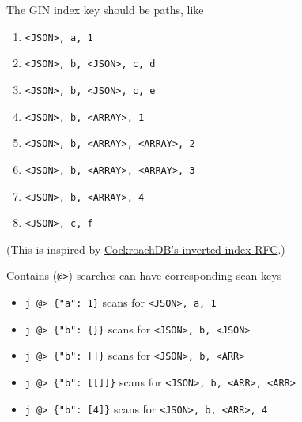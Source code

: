 \documentclass[
]{article}
\providecommand{\tightlist}{%
  \setlength{\itemsep}{0pt}\setlength{\parskip}{0pt}}
\begin{document}
The GIN index key should be paths, like

\begin{enumerate}
\def\labelenumi{\arabic{enumi}.}
\tightlist
\item
  \texttt{\textless{}JSON\textgreater{},\ a,\ 1}
\item
  \texttt{\textless{}JSON\textgreater{},\ b,\ \textless{}JSON\textgreater{},\ c,\ d}
\item
  \texttt{\textless{}JSON\textgreater{},\ b,\ \textless{}JSON\textgreater{},\ c,\ e}
\item
  \texttt{\textless{}JSON\textgreater{},\ b,\ \textless{}ARRAY\textgreater{},\ 1}
\item
  \texttt{\textless{}JSON\textgreater{},\ b,\ \textless{}ARRAY\textgreater{},\ \textless{}ARRAY\textgreater{},\ 2}
\item
  \texttt{\textless{}JSON\textgreater{},\ b,\ \textless{}ARRAY\textgreater{},\ \textless{}ARRAY\textgreater{},\ 3}
\item
  \texttt{\textless{}JSON\textgreater{},\ b,\ \textless{}ARRAY\textgreater{},\ 4}
\item
  \texttt{\textless{}JSON\textgreater{},\ c,\ f}
\end{enumerate}

(This is inspired by
\href{https://github.com/cockroachdb/cockroach/blob/master/docs/RFCS/20171020_inverted_indexes.md}{CockroachDB's
inverted index RFC}.)

Contains (\texttt{@\textgreater{}}) searches can have corresponding scan
keys

\begin{itemize}
\tightlist
\item
  \texttt{j\ @\textgreater{}\ \textquotesingle{}\{"a":\ 1\}\textquotesingle{}}
  scans for \texttt{\textless{}JSON\textgreater{},\ a,\ 1}
\item
  \texttt{j\ @\textgreater{}\ \textquotesingle{}\{"b":\ \{\}\}\textquotesingle{}}
  scans for
  \texttt{\textless{}JSON\textgreater{},\ b,\ \textless{}JSON\textgreater{}}
\item
  \texttt{j\ @\textgreater{}\ \textquotesingle{}\{"b":\ {[}{]}\}\textquotesingle{}}
  scans for
  \texttt{\textless{}JSON\textgreater{},\ b,\ \textless{}ARR\textgreater{}}
\item
  \texttt{j\ @\textgreater{}\ \textquotesingle{}\{"b":\ {[}{[}{]}{]}\}\textquotesingle{}}
  scans for
  \texttt{\textless{}JSON\textgreater{},\ b,\ \textless{}ARR\textgreater{},\ \textless{}ARR\textgreater{}}
\item
  \texttt{j\ @\textgreater{}\ \textquotesingle{}\{"b":\ {[}4{]}\}\textquotesingle{}}
  scans for
  \texttt{\textless{}JSON\textgreater{},\ b,\ \textless{}ARR\textgreater{},\ 4}
\end{itemize}
\end{document}
